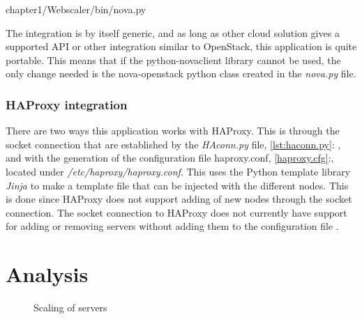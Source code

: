 \begin{center}

{chapter1/Webscaler/bin/nova.py}
\end{center}

The integration is by itself generic, and as long as other cloud solution gives
a supported API or other integration similar to OpenStack, this application is
quite portable. This means that if the python-novaclient library cannot be
used, the only change needed is the nova-openstack python class created in the
\textit{nova.py} file.

\subsubsection{HAProxy integration}
There are two ways this application works with HAProxy. This is through the
socket connection that are established by the \textit{HAconn.py} file,
\ref{lst:haconn.py}: , and with the generation of the
configuration file haproxy.conf, \ref{haproxy.cfg}:,
located under \textit{/etc/haproxy/haproxy.conf}. This uses the Python template
library \textit{Jinja} to make a template file that can be injected with the
different nodes. This is done since HAProxy does not support adding of new
nodes through the socket connection.
The socket connection to HAProxy does not currently have support for adding or
removing servers without adding them to the configuration
file \cite{haproxy:configuration_manual}. 

\section{Analysis}
\begin{figure}[htp]
\centering
{}
\caption{\label{fig:server_scaling}Scaling of servers}
\end{figure}

